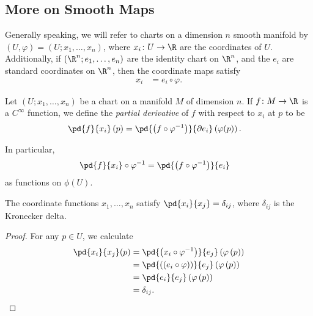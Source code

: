 \documentclass[10pt]{mypackage}
\begin{document}
\subsection{More on Smooth Maps}%
Generally speaking, we will refer to charts on a dimension $n$ smooth manifold by $\left( U,\varphi \right) = \left( U;x_1,\dots,x_n \right)$, where $x_i\colon U\rightarrow \R$ are the coordinates of $U$. Additionally, if $\left( \R^{n};e_1,\dots,e_n \right)$ are the identity chart on $\R^{n}$, and the $e_i$ are standard coordinates on $\R^{n}$, then the coordinate maps satisfy
\begin{align*}
  x_i &= e_i\circ \varphi.
\end{align*}
\begin{definition}
  Let $\left( U;x_1,\dots,x_n \right)$ be a chart on a manifold $M$ of dimension $n$. If $f\colon M\rightarrow \R$ is a $C^{\infty}$ function, we define the \textit{partial derivative} of $f$ with respect to $x_i$ at $p$ to be
  \begin{align*}
    \pd{f}{x_i}\left( p \right) &= \pd{\left( f\circ \varphi^{-1} \right)}{\partial e_i} \left( \varphi(p) \right).
  \end{align*}
\end{definition}
  In particular,
  \begin{align*}
    \pd{f}{x_i}\circ \varphi^{-1} &= \pd{\left( f\circ \varphi^{-1} \right)}{e_i}
  \end{align*}
  as functions on $\phi(U)$.
\begin{proposition}
  The coordinate functions $x_1,\dots,x_n$ satisfy $\pd{x_i}{x_j} = \delta_{ij}$, where $\delta_{ij}$ is the Kronecker delta.
\end{proposition}
\begin{proof}
  For any $p\in U$, we calculate
  \begin{align*}
    \pd{x_i}{x_j}(p) &= \pd{\left( x_i\circ \varphi^{-1} \right)}{e_j}\left( \varphi\left( p \right) \right)\\
                     &= \pd{\left( \left( e_i\circ \varphi \right) \right)}{e_j}\left( \varphi\left( p \right) \right)\\
                     &= \pd{e_i}{e_j} \left( \varphi\left( p \right) \right)\\
                     &= \delta_{ij}.
  \end{align*}
\end{proof}
\end{document}
